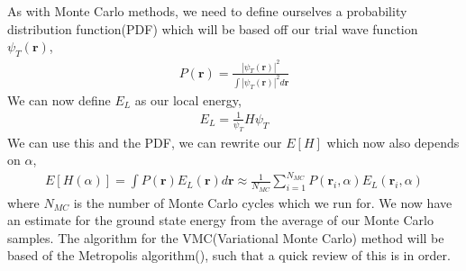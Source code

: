 \documentclass[11pt]{article}
\begin{document}
As with Monte Carlo methods, we need to define ourselves a probability distribution function(PDF) which will be based off our trial wave function $\psi_T(\mathbf{r})$,
\begin{align}
	P(\mathbf{r}) = \frac{|\psi_T(\mathbf{r})|^2}{\int |\psi_T(\mathbf{r})|^2d\mathbf{r}}
	\label{eq:pdf}
\end{align}
We can now define $E_L$ as our local energy,
\begin{align}
	E_L = \frac{1}{\psi_T}H\psi_T
	\label{eq:local-energy}
\end{align}
We can use this and the PDF, we can rewrite our $E[H]$ which now also depends on $\alpha$,
\begin{align*}
	E[H(\alpha)] = \int P(\mathbf{r})E_L(\mathbf{r})d\mathbf{r} \approx \frac{1}{N_{MC}}\sum^{N_{MC}}_{i=1}P(\mathbf{r}_i,\alpha)E_L(\mathbf{r}_i,\alpha)
\end{align*}
where $N_{MC}$ is the number of Monte Carlo cycles which we run for. 
We now have an estimate for the ground state energy from the average of our Monte Carlo samples. The algorithm for the VMC(Variational Monte Carlo) method will be based of the Metropolis algorithm(\cite{metropolis}\cite{metropolis_hastings}), such that a quick review of this is in order.
\end{document}
